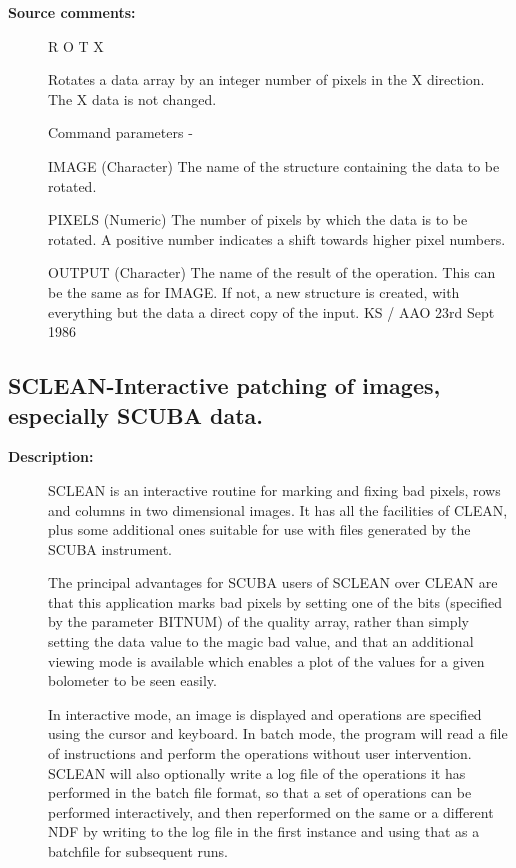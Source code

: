 \begin{description}
\begin{description}
\item [\textbf{Source comments:}]
\begin{terminalv}
 R O T X

 Rotates a data array by an integer number of pixels in the
 X direction.  The X data is not changed.

 Command parameters -

 IMAGE  (Character) The name of the structure containing the data to
        be rotated.

 PIXELS (Numeric) The number of pixels by which the data is to be
        rotated.  A positive number indicates a shift towards higher
        pixel numbers.

 OUTPUT (Character) The name of the result of the operation.  This
        can be the same as for IMAGE.  If not, a new structure
        is created, with everything but the data a direct
        copy of the input.
                                        KS / AAO 23rd Sept 1986
\end{terminalv}
\end{description}
\subsection{SCLEAN-\label{SCLEAN}Interactive patching of images, especially SCUBA data.}
\begin{description}

\item [\textbf{Description:}]
 SCLEAN is an interactive routine for marking and fixing bad pixels,
 rows and columns in two dimensional images.  It has all the
 facilities of CLEAN, plus some additional ones suitable for use
 with files generated by the SCUBA instrument.

 The principal advantages for SCUBA users of SCLEAN over CLEAN are
 that this application marks bad pixels by setting one of the bits
 (specified by the parameter BITNUM) of the quality array, rather
 than simply setting the data value to the magic bad value, and that
 an additional viewing mode is available which enables a plot of the
 values for a given bolometer to be seen easily.

 In interactive mode, an image is displayed and operations are
 specified using the cursor and keyboard.  In batch mode, the program
 will read a file of instructions and perform the operations without
 user intervention.  SCLEAN will also optionally write a log file of
 the operations it has performed in the batch file format, so that
 a set of operations can be performed interactively, and then
 reperformed on the same or a different NDF by writing to the log
 file in the first instance and using that as a batchfile for
 subsequent runs.


\end{description}
\end{description}
